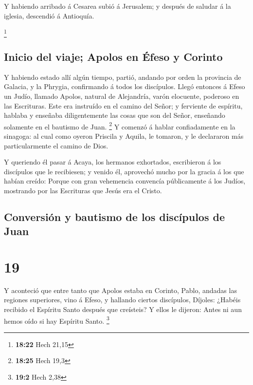 Y habiendo arribado á Cesarea subió á Jerusalem; y
después de saludar á la iglesia, descendió á Antioquía.

\footnote{\textbf{18:22} Hech 21,15}

\hypertarget{inicio-del-viaje-apolos-en-uxe9feso-y-corinto}{%
\subsection{Inicio del viaje; Apolos en Éfeso y
Corinto}\label{inicio-del-viaje-apolos-en-uxe9feso-y-corinto}}

 Y habiendo estado allí algún tiempo, partió, andando por
orden la provincia de Galacia, y la Phrygia, confirmando á todos los
discípulos.  Llegó entonces á Efeso un Judío, llamado
Apolos, natural de Alejandría, varón elocuente, poderoso en las
Escrituras.  Este era instruído en el camino del Señor; y
ferviente de espíritu, hablaba y enseñaba diligentemente las cosas que
son del Señor, enseñando solamente en el bautismo de Juan. \footnote{\textbf{18:25}
  Hech 19,3}  Y comenzó á hablar confiadamente en la
sinagoga: al cual como oyeron Priscila y Aquila, le tomaron, y le
declararon más particularmente el camino de Dios.

 Y queriendo él pasar á Acaya, los hermanos exhortados,
escribieron á los discípulos que le recibiesen; y venido él, aprovechó
mucho por la gracia á los que habían creído:  Porque con
gran vehemencia convencía públicamente á los Judíos, mostrando por las
Escrituras que Jesús era el Cristo.

\hypertarget{conversiuxf3n-y-bautismo-de-los-discuxedpulos-de-juan}{%
\subsection{Conversión y bautismo de los discípulos de
Juan}\label{conversiuxf3n-y-bautismo-de-los-discuxedpulos-de-juan}}

\hypertarget{section-18}{%
\section{19}\label{section-18}}

 Y aconteció que entre tanto que Apolos estaba en Corinto,
Pablo, andadas las regiones superiores, vino á Efeso, y hallando ciertos
discípulos,  Díjoles: ¿Habéis recibido el Espíritu Santo
después que creísteis? Y ellos le dijeron: Antes ni aun hemos oído si
hay Espíritu Santo. \footnote{\textbf{19:2} Hech 2,38}

